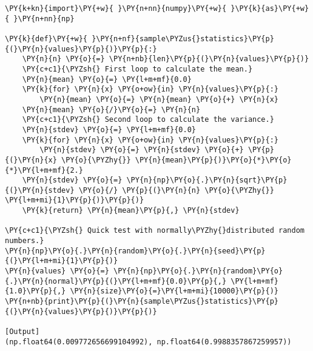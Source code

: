\begin{Verbatim}[label=\makebox{\href{https://github.com/unipi-physics-labs/statnotes/tree/main/snippy/sample_stat1.py}{https://github.com/.../sample\_stat1.py}},commandchars=\\\{\}]
\PY{k+kn}{import}\PY{+w}{ }\PY{n+nn}{numpy}\PY{+w}{ }\PY{k}{as}\PY{+w}{ }\PY{n+nn}{np}

\PY{k}{def}\PY{+w}{ }\PY{n+nf}{sample\PYZus{}statistics}\PY{p}{(}\PY{n}{values}\PY{p}{)}\PY{p}{:}
    \PY{n}{n} \PY{o}{=} \PY{n+nb}{len}\PY{p}{(}\PY{n}{values}\PY{p}{)}
    \PY{c+c1}{\PYZsh{} First loop to calculate the mean.}
    \PY{n}{mean} \PY{o}{=} \PY{l+m+mf}{0.0}
    \PY{k}{for} \PY{n}{x} \PY{o+ow}{in} \PY{n}{values}\PY{p}{:}
        \PY{n}{mean} \PY{o}{=} \PY{n}{mean} \PY{o}{+} \PY{n}{x}
    \PY{n}{mean} \PY{o}{/}\PY{o}{=} \PY{n}{n}
    \PY{c+c1}{\PYZsh{} Second loop to calculate the variance.}
    \PY{n}{stdev} \PY{o}{=} \PY{l+m+mf}{0.0}
    \PY{k}{for} \PY{n}{x} \PY{o+ow}{in} \PY{n}{values}\PY{p}{:}
        \PY{n}{stdev} \PY{o}{=} \PY{n}{stdev} \PY{o}{+} \PY{p}{(}\PY{n}{x} \PY{o}{\PYZhy{}} \PY{n}{mean}\PY{p}{)}\PY{o}{*}\PY{o}{*}\PY{l+m+mf}{2.}
    \PY{n}{stdev} \PY{o}{=} \PY{n}{np}\PY{o}{.}\PY{n}{sqrt}\PY{p}{(}\PY{n}{stdev} \PY{o}{/} \PY{p}{(}\PY{n}{n} \PY{o}{\PYZhy{}} \PY{l+m+mi}{1}\PY{p}{)}\PY{p}{)}
    \PY{k}{return} \PY{n}{mean}\PY{p}{,} \PY{n}{stdev}

\PY{c+c1}{\PYZsh{} Quick test with normally\PYZhy{}distributed random numbers.}
\PY{n}{np}\PY{o}{.}\PY{n}{random}\PY{o}{.}\PY{n}{seed}\PY{p}{(}\PY{l+m+mi}{1}\PY{p}{)}
\PY{n}{values} \PY{o}{=} \PY{n}{np}\PY{o}{.}\PY{n}{random}\PY{o}{.}\PY{n}{normal}\PY{p}{(}\PY{l+m+mf}{0.0}\PY{p}{,} \PY{l+m+mf}{1.0}\PY{p}{,} \PY{n}{size}\PY{o}{=}\PY{l+m+mi}{10000}\PY{p}{)}
\PY{n+nb}{print}\PY{p}{(}\PY{n}{sample\PYZus{}statistics}\PY{p}{(}\PY{n}{values}\PY{p}{)}\PY{p}{)}

[Output]
(np.float64(0.009772656699104992), np.float64(0.9988357867259957))
\end{Verbatim}
